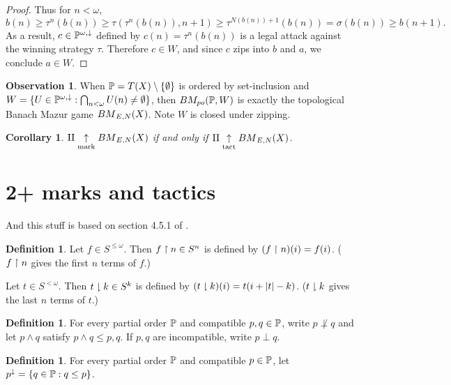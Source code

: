 \documentclass[11pt]{article}
\theoremstyle{plain}
\newtheorem{corollary}[theorem]{Corollary}
\theoremstyle{definition}
\newtheorem{definition}[theorem]{Definition}
\newtheorem{observation}[theorem]{Observation}
\theoremstyle{remark}
\theoremstyle{plain}
\theoremstyle{definition}
\theoremstyle{remark}
\newcommand{\bmPoGame}[2]{BM_{po}(#1,#2)}
\begin{document}
\begin{proof}
    Thus for \(n<\omega\),
    \[
      b(n)
        \geq
      \tau^{n}(b(n))
        \geq
      \tau(\tau^{n}(b(n)),n+1)
        \geq
      \tau^{N(b(n))+1}(b(n))
        =
      \sigma(b(n))
        \geq
      b(n+1)
    .\]
    As a result, \(c\in\mathbb{P}^{\omega,\downarrow}\) defined by \(c(n)=\tau^n(b(n))\)
    is a legal attack against the winning strategy \(\tau\). Therefore
    \(c\in W\), and since \(c\) zips into \(b\) and \(a\), we conclude
    \(a\in W\).
  \end{proof}

  \begin{observation}
    When \(\mathbb{P}=T(X)\setminus\{\emptyset\}\) is ordered by set-inclusion
    and \(W=\{U\in\mathbb{P}^{\omega,\downarrow}:\bigcap_{n<\omega}U(n)\not=\emptyset\}\),
    then \(\bmPoGame{\mb P}{W}\) is exactly the topological Banach Mazur game
    \({BM}_{E,N}(X)\). Note \(W\) is closed under zipping.
  \end{observation}

  \begin{corollary}
  \(\mathrm{II}\underset{\mathrm{mark}}{\uparrow}{BM}_{E,N}(X)\) if and only if
  \(\mathrm{II}\underset{\mathrm{tact}}{\uparrow}{BM}_{E,N}(X)\).
  \end{corollary}


  \section*{2+ marks and tactics}

  And this stuff is based on section 4.5.1 of \cite{bartoszynski1993covering}.

  \begin{definition}
    Let \(f\in S^{\leq\omega}\). Then \(f\restriction n\in S^n\) is defined by
    \((f\restriction n)(i)=f(i)\). (\(f\restriction n\) gives the first \(n\) terms of \(f\).)

    Let \(t\in S^{<\omega}\). Then \(t\downharpoonright k\in S^k\) is defined by
    \((t\downharpoonright k)(i)=t(i+|t|-k)\). (\(t\downharpoonright k\) gives the last \(n\) terms
    of \(t\).)
  \end{definition}

  \begin{definition}
    For every partial order \(\mathbb{P}\) and compatible \(p,q\in\mathbb{P}\),
    write \(p\not\perp q\) and let \(p\wedge q\) satisfy \(p\wedge q\leq p,q\).
    If \(p,q\) are incompatible, write \(p\perp q\).
  \end{definition}

  \begin{definition}
    For every partial order \(\mathbb{P}\) and compatible \(p\in\mathbb{P}\),
    let \(p^\downarrow=\{q\in\mathbb{P}:q\leq p\}\).
\end{definition}
\end{document}
